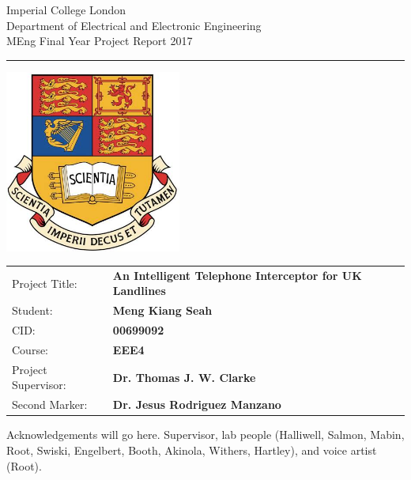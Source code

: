 \documentclass[12pt,a4paper]{report}
\begin{document}
\begin{titlepage}
    \setlength{\parindent}{0pt}
    \setlength{\parskip}{0pt}

    {
    \Large
    \raggedright
    Imperial College London\\[17pt]
    Department of Electrical and Electronic Engineering\\[17pt]
    MEng Final Year Project Report 2017\\[17pt]
    }

    \rule{\columnwidth}{3pt}
    \vfill
    \centering
      \includegraphics[width=0.7\columnwidth,height=60mm,keepaspectratio]{icl.jpg}
    \vfill
    \setlength{\tabcolsep}{0pt}

    \begin{tabular}{p{40mm}p{\dimexpr\columnwidth-40mm}}
	    Project Title: & \textbf{An Intelligent Telephone Interceptor for UK Landlines}\\[12pt]
	    Student: & \textbf{Meng Kiang Seah} \\[12pt]
	    CID: & \textbf{00699092} \\[12pt]
	    Course: & \textbf{EEE4} \\[12pt]
	    Project Supervisor: & \textbf{Dr. Thomas J. W. Clarke} \\[12pt]
	    Second Marker: & \textbf{Dr. Jesus Rodriguez Manzano} \\
    \end{tabular}
\end{titlepage}


\begin{acknowledgments}
 	Acknowledgements will go here. Supervisor, lab people (Halliwell, Salmon, Mabin, Root, Swiski, Engelbert, Booth, Akinola, Withers, Hartley), and voice artist (Root).
\end{acknowledgments}
\end{document}
